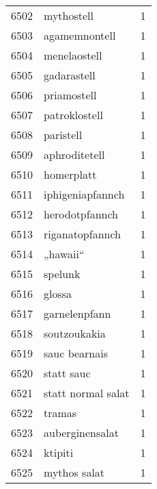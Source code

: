 \begin{tabular}{llr}
6502 &                                         mythostell &      1 \\
6503 &                                      agamemnontell &      1 \\
6504 &                                       menelaostell &      1 \\
6505 &                                        gadarastell &      1 \\
6506 &                                        priamostell &      1 \\
6507 &                                      patroklostell &      1 \\
6508 &                                          paristell &      1 \\
6509 &                                      aphroditetell &      1 \\
6510 &                                         homerplatt &      1 \\
6511 &                                   iphigeniapfannch &      1 \\
6512 &                                     herodotpfannch &      1 \\
6513 &                                    riganatopfannch &      1 \\
6514 &                                           „hawaii“ &      1 \\
6515 &                                            spelunk &      1 \\
6516 &                                             glossa &      1 \\
6517 &                                      garnelenpfann &      1 \\
6518 &                                       soutzoukakia &      1 \\
6519 &                                      sauc bearnais &      1 \\
6520 &                                         statt sauc &      1 \\
6521 &                                 statt normal salat &      1 \\
6522 &                                             tramas &      1 \\
6523 &                                    auberginensalat &      1 \\
6524 &                                            ktipiti &      1 \\
6525 &                                       mythos salat &      1 \\

\end{tabular}
